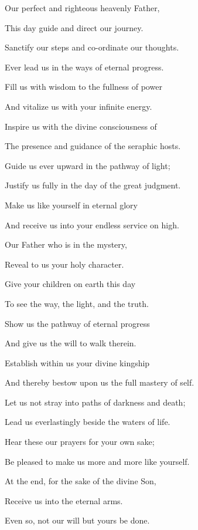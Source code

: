 \separatorshort
\begin{quoting}[vskip=\baselineskip,leftmargin=4ex,rightmargin=2ex]
\setlength{\parindent}{-0.7em}
\hspace*{-1.2em}
Our perfect and righteous heavenly Father,\par
This day guide and direct our journey.\par
Sanctify our steps and co\hyp{}ordinate our thoughts.\par
Ever lead us in the ways of eternal progress.\par
Fill us with wisdom to the fullness of power\par
And vitalize us with your infinite energy.\par
Inspire us with the divine consciousness of\par
The presence and guidance of the seraphic hosts.\par
Guide us ever upward in the pathway of light;\par
Justify us fully in the day of the great judgment.\par
Make us like yourself in eternal glory\par
And receive us into your endless service on high.\par
\end{quoting}
\separatorshort
\begin{quoting}[vskip=\baselineskip,leftmargin=4ex,rightmargin=2ex]
\setlength{\parindent}{-0.7em}
\hspace*{-1.2em}
Our Father who is in the mystery,\par
Reveal to us your holy character.\par
Give your children on earth this day\par
To see the way, the light, and the truth.\par
Show us the pathway of eternal progress\par
And give us the will to walk therein.\par
Establish within us your divine kingship\par
And thereby bestow upon us the full mastery of self.\par
Let us not stray into paths of darkness and death;\par
Lead us everlastingly beside the waters of life.\par
Hear these our prayers for your own sake;\par
Be pleased to make us more and more like yourself.\par
At the end, for the sake of the divine Son,\par
Receive us into the eternal arms.\par
Even so, not our will but yours be done.\par
\end{quoting}

